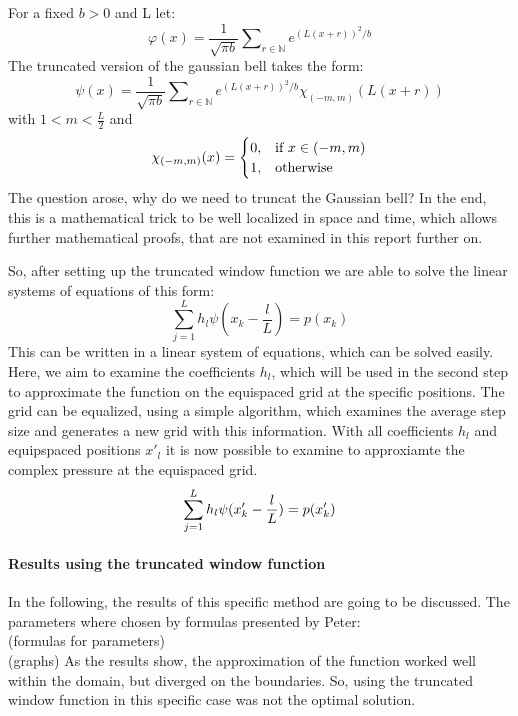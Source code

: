\documentclass{article}
\begin{document}
For a fixed $b>0$ and L let:
\begin{equation}
\varphi(x)= \frac{1}{\sqrt{\pi b}} \sum\nolimits_{r \in \mathbb{N}}  e^{(L(x+r))^2/b}
\end{equation}
The truncated version of the gaussian bell takes the form: 
\begin{equation}
\psi(x)= \frac{1}{\sqrt{\pi b}} \sum\nolimits_{r \in \mathbb{N}}  e^{(L(x+r))^2/b}\chi_{(-m,m)}(L(x+r))
\end{equation}
with $1<m < \frac{L}{2}$ and
\begin{equation}
    \chi_{(-m,m)}(x)=
    \begin{cases}
      0, & \text{if}\ x\in (-m,m) \\
      1, & \text{otherwise}
    \end{cases}\notag
\end{equation} 
The question arose, why do we need to truncat the Gaussian bell? In the end, this is a mathematical trick to be well localized in space and time, which allows further mathematical proofs, that are not examined in this report further on.

So, after setting up the truncated window function we are able to solve the linear systems of equations of this form:
\begin{equation}
\sum\limits_{j=1}^L h_{l}\psi(x_{k}-\frac{l}{L})=p(x_{k})
\end{equation}
This can be written in a linear system of equations, which can be solved easily.
Here, we aim to examine the coefficients $h_{l}$, which will be used in the second step to approximate the function on the equispaced grid at the specific positions.
The grid can be equalized, using a simple algorithm, which examines the average step size and generates a new grid with this information.
With all coefficients $h_{l}$ and equipspaced positions $x'_{l}$ it is now possible to examine to approxiamte the complex pressure at the equispaced grid. 
\begin{equation}
 \sum\limits_{j=1}^L h_{l}\psi(x'_{k}-\frac{l}{L})=p(x'_{k})\notag
\end{equation}

\paragraph{Results using the truncated window function} $ $ \\[1ex]
In the following, the results of this specific method are going to be discussed.
The parameters where chosen by formulas presented by Peter: \\
	(formulas for parameters) \\
	(graphs)
As the results show, the approximation of the function worked well within the domain, but diverged on the boundaries.
So, using the truncated window function in this specific case was not the optimal solution. \\[1ex]
\end{document}
